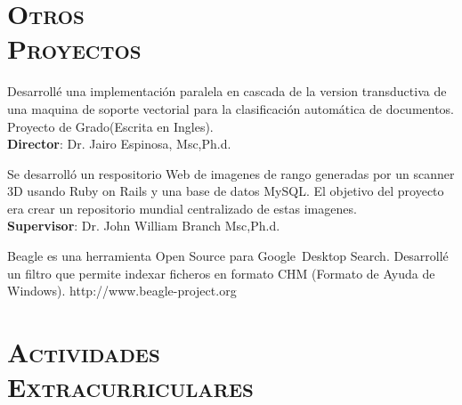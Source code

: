 \begin{resume}
\section{\textsc{Otros\\  Proyectos}}

\begin{position}
Desarroll\'{e} una implementaci\'{o}n  paralela en cascada de la version transductiva de una maquina de soporte vectorial
para la clasificaci\'{o}n autom\'{a}tica de documentos. Proyecto de Grado(Escrita en Ingles).\\
\textbf{Director}:  Dr. Jairo Espinosa, Msc,Ph.d.
\end{position}

\begin{position}
 Se desarroll\'{o} un respositorio Web de imagenes de rango generadas por un scanner 3D  usando Ruby on Rails y una base de datos MySQL.
El objetivo del proyecto era crear un repositorio mundial centralizado de estas imagenes. \\
 \textbf{Supervisor}: Dr. John William Branch Msc,Ph.d.
\end{position}

\begin{position}
Beagle es una herramienta Open Source para Google\texttrademark  \  Desktop Search. Desarroll\'{e} un filtro que permite
indexar ficheros en formato CHM (Formato de Ayuda de Windows).
http://www.beagle-project.org
\end{position}

\section{\textsc{Actividades \\ Extracurriculares }}


\end{resume}
